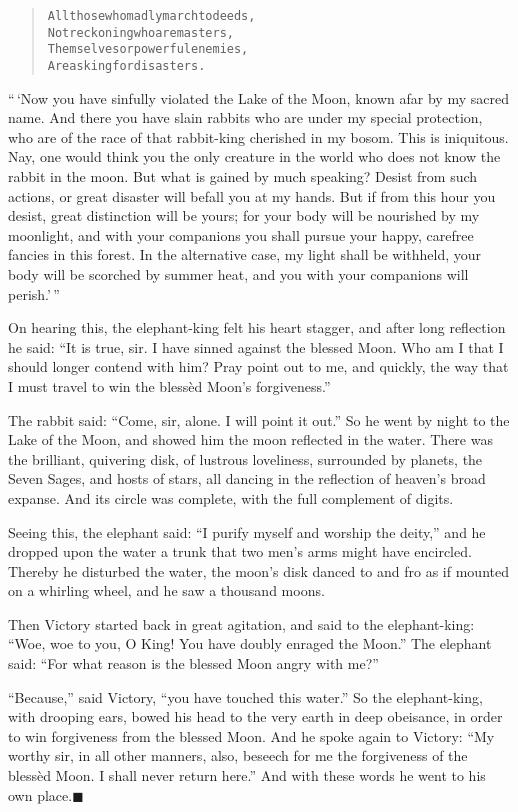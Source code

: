 \documentclass[article, twoside, 14pt]{memoir}
\newcommand{\qed}{\hfill \ensuremath{\blacksquare}}
\renewenvironment{verbatim}{%
\begin{quote}%
\vskip -10pt%
\begin{alltt}\normalfont\large}{\end{alltt}%
\end{quote}%
\vskip -10pt
} %
\begin{document}
\begin{verbatim}
All those who madly march to deeds,
Not reckoning who are masters,
Themselves or powerful enemies,
Are asking for disasters.
\end{verbatim}
``\,`Now you have sinfully violated the Lake of the Moon, known afar by my sacred name. And there you have slain rabbits who are under my special protection, who are of the race of that rabbit-king cherished in my bosom. This is iniquitous. Nay, one would think you the only creature in the world who does not know the rabbit in the moon. But what is gained by much speaking? Desist from such actions, or great disaster will befall you at my hands. But if from this hour you desist, great distinction will be yours; for your body will be nourished by my moonlight, and with your companions you shall pursue your happy, carefree fancies in this forest. In the alternative case, my light shall be withheld, your body will be scorched by summer heat, and you with your companions will perish.'\,''

On hearing this, the elephant-king felt his heart stagger, and
after long reflection he said:
``It is true, sir. I have sinned against the blessed Moon. Who am I that I should longer contend with him? Pray point out to me, and quickly, the way that I must travel to win the blessèd Moon's forgiveness.''

The rabbit said: ``Come, sir, alone. I will point it out.'' So he
went by night to the Lake of the Moon, and showed him the moon
reflected in the water. There was the brilliant, quivering disk, of
lustrous loveliness, surrounded by planets, the Seven Sages, and
hosts of stars, all dancing in the reflection of heaven's broad
expanse. And its circle was complete, with the full complement of
digits.

Seeing this, the elephant said:
``I purify myself and worship the deity,'' and he dropped upon the
water a trunk that two men's arms might have encircled. Thereby he
disturbed the water, the moon's disk danced to and fro as if
mounted on a whirling wheel, and he saw a thousand moons.

Then Victory started back in great agitation, and said to the
elephant-king:
``Woe, woe to you, O King! You have doubly enraged the Moon.'' The
elephant said:
``For what reason is the blessed Moon angry with me?''

``Because,'' said Victory, ``you have touched this water.'' So the
elephant-king, with drooping ears, bowed his head to the very earth
in deep obeisance, in order to win forgiveness from the blessed
Moon. And he spoke again to Victory:
``My worthy sir, in all other manners, also, beseech for me the forgiveness of the blessèd Moon. I shall never return here.''
And with these words he went to his own place.\hyperref[s49]{\qed}
\end{document}
